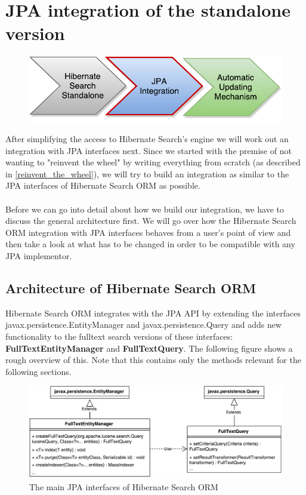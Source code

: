 \pagebreak
~
\pagebreak

\section{JPA integration of the standalone version} \label{integration_jpa}

\begin{figure}[ht]
	\centering
	\includegraphics[scale=0.75]{images/timeline_genericjpa_second.pdf}
	\label{project_timeline_second}
\end{figure}
\noindent
After simplifying the access to Hibernate Search's engine we will work out an integration with JPA interfaces next. Since we started with the premise of not wanting to "reinvent the wheel" by writing everything from scratch (as described in \ref{reinvent_the_wheel}), we will try to build an integration as similar to the JPA interfaces of Hibernate Search ORM as possible.
\\\\
Before we can go into detail about how we build our integration, we have to discuss the general architecture first. We will go over how the Hibernate Search ORM integration with JPA interfaces behaves from a user's point of view and then take a look at what has to be changed in order to be compatible with any JPA implementor.

\pagebreak

\subsection{Architecture of Hibernate Search ORM}

Hibernate Search ORM integrates with the JPA API by extending the interfaces  javax.persistence.EntityManager and javax.persistence.Query and adds new functionality to the fulltext search versions of these interfaces: \textbf{FullTextEntityManager} and \textbf{FullTextQuery}. The following figure shows a rough overview of this. Note that this contains only the methods relevant for the following sections.
\\
\begin{figure}[ht]
	\centering
	\includegraphics[scale=0.6]{images/hibernate_search_jpa_integration_original.pdf}
	\caption{The main JPA interfaces of Hibernate Search ORM}
	\label{hibernate_search_jpa_integration_original}
\end{figure}

